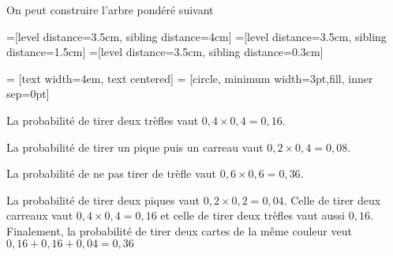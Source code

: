 \documentclass[11pt,fleqn, openany]{book} %
\begin{document}
\begin{solution}

On peut construire l'arbre pondéré suivant

=[level distance=3.5cm, sibling distance=4cm]
=[level distance=3.5cm, sibling distance=1.5cm]
=[level distance=3.5cm, sibling distance=0.3cm]

 = [text width=4em, text centered]
 = [circle, minimum width=3pt,fill, inner sep=0pt]


\begin{center}
\end{center}
La probabilité de tirer deux trèfles vaut $0,4 \times 0,4 = 0,16$.

La probabilité de tirer un pique puis un carreau vaut $0,2 \times 0,4 = 0,08$.

La probabilité de ne pas tirer de trèfle vaut $0,6 \times 0,6 = 0,36$.

La probabilité de tirer deux piques vaut $0,2 \times 0,2 = 0,04$. Celle de tirer deux carreaux vaut $0,4 \times 0,4 = 0,16$ et celle de tirer deux trèfles vaut aussi $0,16$. Finalement, la probabilité de tirer deux cartes de la même couleur veut $0,16+0,16+0,04=0,36$

\end{solution}
\end{document}
